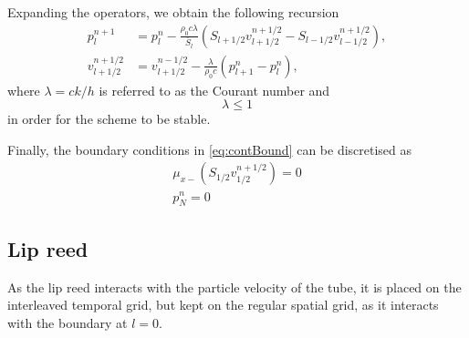 Expanding the operators, we obtain the following recursion
\begin{subequations}\label{eq:updateNormal}
    \begin{align}
        p_l^{n+1} &= p_l^n - \frac{\rho_0 c \lambda}{\bar{S}_l}(S_{l+1/2}v_{l+1/2}^{n+1/2}-S_{l-1/2}v_{l-1/2}^{n+1/2}),\label{eq:pressureUpdate}\\
        v_{l+1/2}^{n+1/2} &= v_{l+1/2}^{n-1/2}-\frac{\lambda}{\rho_0 c}(p_{l+1}^n - p_l^n),\label{eq:velocityUpdate}
    \end{align}
\end{subequations}
where $\lambda = ck/h$ is referred to as the Courant number and
\begin{equation}
    \lambda \leq 1
\end{equation}
in order for the scheme to be stable. 

Finally, the boundary conditions in \eqref{eq:contBound} can be discretised as
\begin{subequations}
    \begin{align}
        \mu_{x-}\left(S_{1/2}v_{1/2}^{n+1/2}\right) = 0\label{eq:discNeumann}\\
        p_N^n = 0\label{eq:discDirich}
    \end{align}    
\end{subequations}

\subsection{Lip reed}
As the lip reed interacts with the particle velocity of the tube, it is placed on the interleaved temporal grid, but kept on the regular spatial grid, as it interacts with the boundary at $l=0$.

